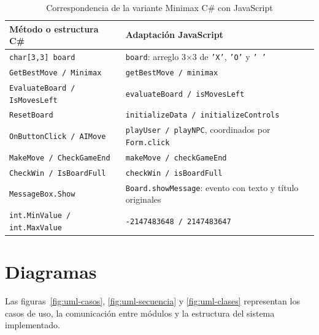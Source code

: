 \documentclass[12pt,a4paper]{article}
\begin{document}
\begin{table}[H]
\centering\small
\caption{Correspondencia de la variante Minimax C\# con JavaScript}
\begin{tabular}{p{6.3cm}p{6.6cm}}
\toprule Método o estructura C\# & Adaptación JavaScript\\\midrule
\texttt{char[3,3] board} & \texttt{board}: arreglo 3$\times$3 de \texttt{'X'}, \texttt{'O'} y \texttt{' '}\\
\texttt{GetBestMove / Minimax} & \texttt{getBestMove / minimax}\\
\texttt{EvaluateBoard / IsMovesLeft} & \texttt{evaluateBoard / isMovesLeft}\\
\texttt{ResetBoard} & \texttt{initializeData / initializeControls}\\
\texttt{OnButtonClick / AIMove} & \texttt{playUser / playNPC}, coordinados por \texttt{Form.click}\\
\texttt{MakeMove / CheckGameEnd} & \texttt{makeMove / checkGameEnd}\\
\texttt{CheckWin / IsBoardFull} & \texttt{checkWin / isBoardFull}\\
\texttt{MessageBox.Show} & \texttt{Board.showMessage}: evento con texto y título originales\\
\texttt{int.MinValue / int.MaxValue} & \texttt{-2147483648 / 2147483647}\\
\bottomrule
\end{tabular}
\end{table}

\section{Diagramas}
Las figuras~\ref{fig:uml-casos}, \ref{fig:uml-secuencia} y \ref{fig:uml-clases}
representan los casos de uso, la comunicación entre módulos y la estructura del
sistema implementado.
\end{document}
